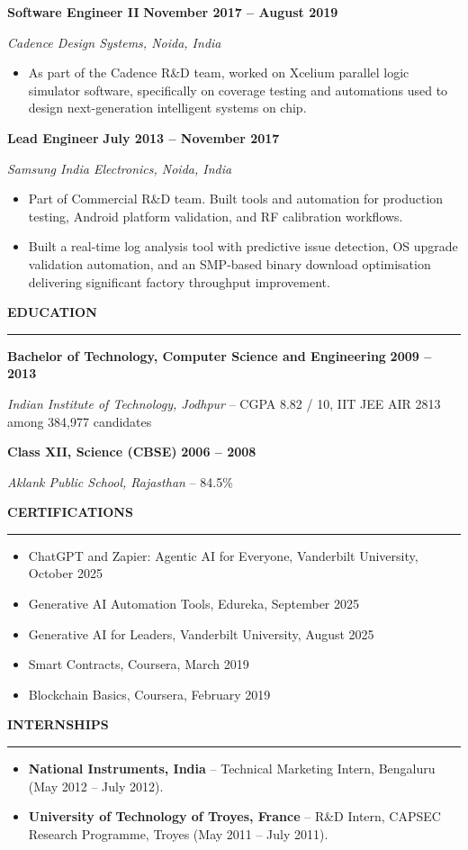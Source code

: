 \documentclass[9pt,a4paper]{extarticle}
\newcommand{\cvsection}[1]{%
  \vspace{2pt}%
  {\normalsize\bfseries\color{textdark}\MakeUppercase{#1}}\par
  \vspace{-1pt}%
  {\color{accent}\rule{\linewidth}{0.6pt}}\par
  \vspace{0pt}%
}
\newcommand{\role}[4]{%
  \textbf{#1} \hfill \textbf{#4}\par
  \textit{#2, #3}\par\vspace{0pt}
}
\newcommand{\edublock}[4]{%
  \textbf{#1} \hfill \textbf{#4}\par
  \textit{#2} -- #3\par\vspace{0pt}
}
\begin{document}
\role{Software Engineer II}{Cadence Design Systems}{Noida, India}{November 2017 -- August 2019}
\begin{itemize}
  \item As part of the Cadence R\&D team, worked on Xcelium parallel logic simulator
        software, specifically on coverage testing and automations used to design
        next-generation intelligent systems on chip.
\end{itemize}

\role{Lead Engineer}{Samsung India Electronics}{Noida, India}{July 2013 -- November 2017}
\begin{itemize}
  \item Part of Commercial R\&D team. Built tools and automation for production
        testing, Android platform validation, and RF calibration workflows.
  \item Built a real-time log analysis tool with predictive issue detection, OS
        upgrade validation automation, and an SMP-based binary download optimisation
        delivering significant factory throughput improvement.
\end{itemize}

\cvsection{Education}
\edublock{Bachelor of Technology, Computer Science and Engineering}{Indian Institute of Technology, Jodhpur}{CGPA 8.82 / 10, IIT JEE AIR 2813 among 384,977 candidates}{2009 -- 2013}
\edublock{Class XII, Science (CBSE)}{Aklank Public School, Rajasthan}{84.5\%}{2006 -- 2008}

\cvsection{Certifications}
\begin{itemize}
  \item ChatGPT and Zapier: Agentic AI for Everyone, Vanderbilt University, October 2025
  \item Generative AI Automation Tools, Edureka, September 2025
  \item Generative AI for Leaders, Vanderbilt University, August 2025
  \item Smart Contracts, Coursera, March 2019
  \item Blockchain Basics, Coursera, February 2019
\end{itemize}

\cvsection{Internships}
\begin{itemize}
  \item \textbf{National Instruments, India} -- Technical Marketing Intern, Bengaluru
        (May 2012 -- July 2012).
  \item \textbf{University of Technology of Troyes, France} -- R\&D Intern, CAPSEC
        Research Programme, Troyes (May 2011 -- July 2011).
\end{itemize}
\end{document}
